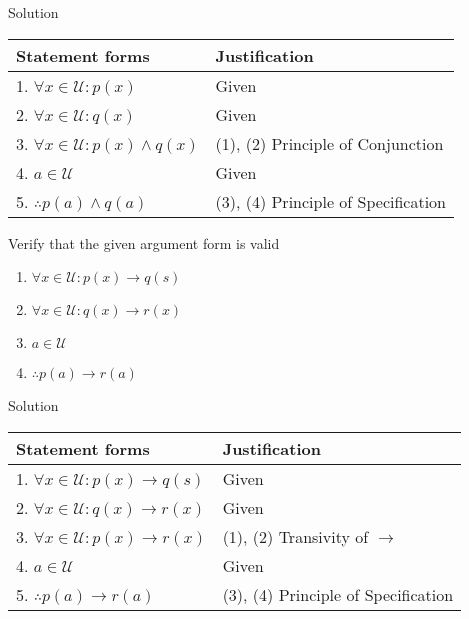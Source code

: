 Solution
\begin{table}[hbt!]
    \centering
    \begin{tabular}{|l | l|} 
    \hline
    Statement forms & Justification\\ [0.5ex] 
    \hline
        1. $\forall x \in \mathcal U: p(x)$ & Given \\
        2. $\forall x \in \mathcal U: q(x)$ & Given \\
        3. $\forall x \in \mathcal U: p(x) \land q(x)$ & (1), (2) Principle of Conjunction \\
        4. $a \in \mathcal U$ & Given \\
        5. $\therefore p(a) \land q(a)$ & (3), (4) Principle of Specification \\
    \hline
    \end{tabular}
\end{table}

\begin{longfbox}
    \begin{bt} \label{pro:practice2.34}
        Verify that the given argument form is valid
        \begin{enumerate}
            \item[] $\forall x \in \mathcal U: p(x) \rightarrow q(s)$
            \item[] $\forall x \in \mathcal U: q(x) \rightarrow r(x)$
            \item[] $a \in \mathcal U$
            \item[] $\therefore p(a) \rightarrow r(a)$
        \end{enumerate}
    \end{bt}
\end{longfbox}

Solution
\begin{table}[hbt!]
    \centering
    \begin{tabular}{|l | l|} 
    \hline
    Statement forms & Justification\\ [0.5ex] 
    \hline
        1. $\forall x \in \mathcal U: p(x) \rightarrow q(s)$ & Given \\
        2. $\forall x \in \mathcal U: q(x) \rightarrow r(x)$ & Given \\
        3. $\forall x \in \mathcal U: p(x) \rightarrow r(x)$ & (1), (2) Transivity of $\rightarrow$ \\
        4. $a \in \mathcal U$ & Given \\
        5. $\therefore p(a) \rightarrow r(a)$ & (3), (4) Principle of Specification \\
    \hline
    \end{tabular}
\end{table}

